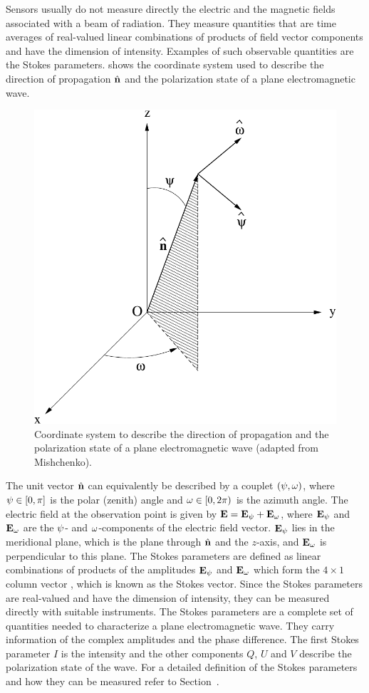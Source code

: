 Sensors usually do not measure directly the electric and the magnetic
fields associated with a beam of radiation. They measure quantities
that are time averages of real-valued linear combinations of products
of field vector components and have the dimension of intensity.
Examples of such observable quantities are the Stokes parameters.
 shows the coordinate system used
to describe the direction of propagation $\hat{{\bf n}}$ and the
polarization state of a plane electromagnetic wave.
\begin{figure}[t]
 \begin{center}
   \includegraphics*[width=0.6\hsize]{coordinate_system}
   \caption{Coordinate system to describe the direction of propagation and the polarization state of a plane electromagnetic wave (adapted from Mishchenko).}
 \end{center}
\end{figure}
The unit vector $\hat{{\bf n}}$ can equivalently be described by a
couplet $(\psi, \omega)$, where ${\psi \in [0,\pi]}$ is the polar
(zenith) angle and $\omega \in [0,2\pi)$ is the azimuth angle. The
electric field at the observation point is given by $\mathbf{E} =
\mathbf{E}_{\psi} + \mathbf{E}_{\omega}$, where $ \mathbf{E}_{\psi}$ and
$\mathbf{E}_{\omega}$ are the $\psi$- and $\omega$-components of the
electric field vector.  $\mathbf{E}_{\psi}$ lies in the meridional
plane, which is the plane through $\hat{{\bf n}}$ and the $z$-axis, and
$\mathbf{E}_{\omega}$ is perpendicular to this plane.
The Stokes parameters are defined as linear combinations of products
of the amplitudes $\mathbf{E}_{\psi}$ and  $\mathbf{E}_{\omega}$ which
form the $4\times1$ column vector \StoVec,
which is known as the Stokes vector.  Since the Stokes parameters are
real-valued and have the dimension of intensity, they can be measured
directly with suitable instruments. The Stokes parameters are a
complete set of quantities needed to characterize a plane
electromagnetic wave. They carry information of the complex amplitudes
and the phase difference.  The first Stokes parameter $I$ is the
intensity and the other components $Q$, $U$ and $V$ describe the
polarization state of the wave. For a detailed definition of the
Stokes parameters and how they can be measured refer to
Section~.

